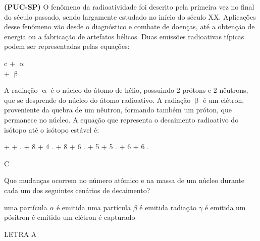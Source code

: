 \documentclass[9 pt]{scrartcl}
\begin{document}
\begin{exercise}[points=1.0]
\textbf{(PUC-SP)} O fenômeno da radioatividade foi descrito pela primeira vez no final do século passado, sendo largamente estudado no início do século XX. Aplicações desse fenômeno vão desde o diagnóstico e combate de doenças, até a obtenção de energia ou a fabricação de artefatos bélicos. Duas emissões radioativas típicas podem ser representadas pelas equações:

\begin{tblr}{c}
 \ch{->}   + $\upalpha$\\
 \ch{->}   + $\upbeta$
\end{tblr}


A radiação \(\upalpha\) é o núcleo do átomo de hélio, possuindo 2 prótons e 2 nêutrons, que se desprende do núcleo do átomo radioativo. A radiação \(\upbeta\) é um elétron, proveniente da quebra de um nêutron, formando também um próton, que permanece no núcleo. A equação que representa o decaimento radioativo do isótopo até o isótopo estável  é:

\begin{choice}
\choice  {} \ch{->}   + \upalpha  \; + \upbeta.
\choice  {} \ch{->}   + 8\upalpha  \; + 4 \upbeta.
\choice  {} \ch{->}   + 8\upalpha \; + 6 \upbeta.
\choice {} \ch{->}   + 5\upalpha \; + 5 \upbeta.
\choice  {} \ch{->}   + 6\upalpha \; + 6 \upbeta.
\end{choice}
\end{exercise}
\begin{solution}
C
\end{solution}






\begin{exercise}[points=1.0]
Que mudanças ocorrem no número atômico e na massa de um núcleo durante cada um dos seguintes cenários de decaimento?
\begin{choice}
\choice uma partícula \(\alpha\) é emitida
\choice uma partícula \(\beta\) é emitida
\choice radiação \(\gamma\) é emitida
\choice um pósitron é emitido
\choice um elétron é capturado
\end{choice}
\end{exercise}
\begin{solution}
LETRA A
\end{solution}
\end{document}
